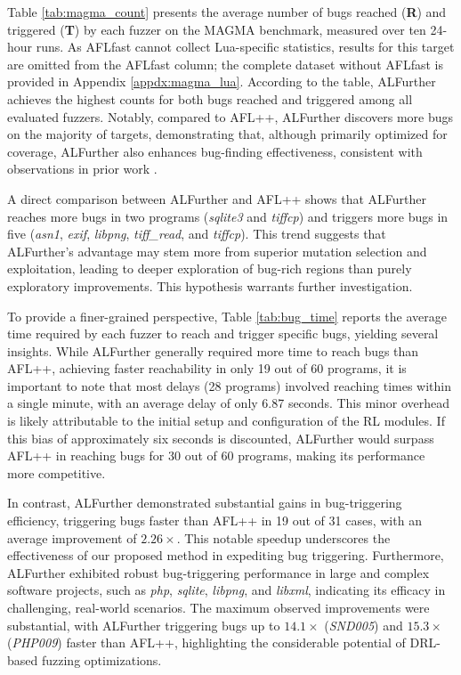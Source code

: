 \documentclass[lettersize,journal]{IEEEtran}
\begin{document}
Table \ref{tab:magma_count} presents the average number of bugs reached (\textbf{R}) and triggered (\textbf{T}) by each fuzzer on the MAGMA benchmark, measured over ten 24-hour runs. As AFLfast cannot collect Lua-specific statistics, results for this target are omitted from the AFLfast column; the complete dataset without AFLfast is provided in Appendix \ref{appdx:magma_lua}. According to the table, ALFurther achieves the highest counts for both bugs reached and triggered among all evaluated fuzzers. Notably, compared to AFL++, ALFurther discovers more bugs on the majority of targets, demonstrating that, although primarily optimized for coverage, ALFurther also enhances bug-finding effectiveness, consistent with observations in prior work \cite{bohmeFuzzingExponentialCost2020}.

A direct comparison between ALFurther and AFL++ shows that ALFurther reaches more bugs in two programs (\textit{sqlite3} and \textit{tiffcp}) and triggers more bugs in five (\textit{asn1}, \textit{exif}, \textit{libpng}, \textit{tiff\_read}, and \textit{tiffcp}). This trend suggests that ALFurther’s advantage may stem more from superior mutation selection and exploitation, leading to deeper exploration of bug-rich regions than purely exploratory improvements. This hypothesis warrants further investigation.

To provide a finer-grained perspective, Table \ref{tab:bug_time} reports the average time required by each fuzzer to reach and trigger specific bugs, yielding several insights. While ALFurther generally required more time to reach bugs than AFL++, achieving faster reachability in only 19 out of 60 programs, it is important to note that most delays (28 programs) involved reaching times within a single minute, with an average delay of only 6.87 seconds. This minor overhead is likely attributable to the initial setup and configuration of the RL modules. If this bias of approximately six seconds is discounted, ALFurther would surpass AFL++ in reaching bugs for 30 out of 60 programs, making its performance more competitive.

In contrast, ALFurther demonstrated substantial gains in bug-triggering efficiency, triggering bugs faster than AFL++ in 19 out of 31 cases, with an average improvement of $2.26\times$. This notable speedup underscores the effectiveness of our proposed method in expediting bug triggering. Furthermore, ALFurther exhibited robust bug-triggering performance in large and complex software projects, such as \textit{php}, \textit{sqlite}, \textit{libpng}, and \textit{libxml}, indicating its efficacy in challenging, real-world scenarios. The maximum observed improvements were substantial, with ALFurther triggering bugs up to $14.1\times$ (\textit{SND005}) and $15.3\times$ (\textit{PHP009}) faster than AFL++, highlighting the considerable potential of DRL-based fuzzing optimizations.
\end{document}
